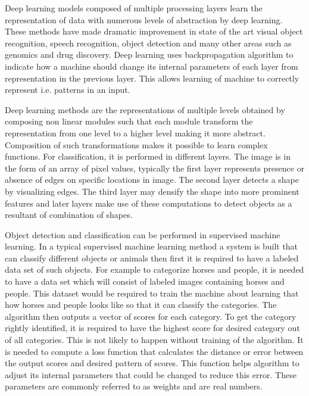 \documentclass[11pt]{article}
\begin{document}
Deep learning models composed of multiple processing layers learn the representation of data with numerous levels of abstraction by deep learning. These methods have made dramatic improvement in state of the art visual object recognition, speech recognition, object detection and many other areas such as genomics and drug discovery. Deep learning uses backpropagation algorithm to indicate how a machine should change its internal parameters of each layer from representation in the previous layer. This allows learning of machine to correctly represent i.e. patterns in an input.

Deep learning methods are the representations of multiple levels obtained by composing non linear modules such that each module transform the representation from one level to a higher level making it more abstract. Composition of such transformations makes it possible to learn complex functions. For classification, it is performed in different layers. The image is in the form of an array of pixel values, typically the first layer represents presence or absence of edges on specific locations in image.  The second layer detects a shape by visualizing edges. The third layer may densify the shape into more prominent features and later layers make use of these computations to detect objects as a resultant of combination of shapes.

Object detection and classification can be performed in supervised machine learning. In a typical supervised machine learning method a system is built that can classify different objects or animals then first it is required to have a labeled data set of such objects. For example to categorize horses and people, it is needed to have a data set which will consist of labeled images containing horses and people. This dataset would be required to train the machine about learning that how horses and people looks like so that it can classify the categories. The algorithm then outputs a vector of scores for each category. To get the category rightly identified, it is required to have the highest score for desired category out of all categories. This is not likely to happen without training of the algorithm. It is needed to compute a loss function that calculates the distance or error between the output scores and desired pattern of scores. This function helps algorithm to adjust its internal parameters that could be changed to reduce this error. These parameters are commonly referred to as weights and are real numbers.

\end{document}
